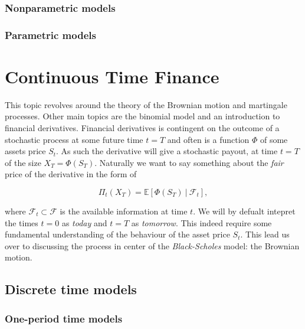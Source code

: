 \documentclass[a4paper,12pt,openany]{book}
\begin{document}
\hypertarget{nonparametric-models}{%
\subsection{Nonparametric models}\label{nonparametric-models}}

\hypertarget{parametric-models}{%
\subsection{Parametric models}\label{parametric-models}}

\hypertarget{continuous-time-finance}{%
\chapter{Continuous Time Finance}\label{continuous-time-finance}}

This topic revolves around the theory of the Brownian motion and martingale processes. Other main topics are the binomial model and an introduction to financial derivatives. Financial derivatives is contingent on the outcome of a stochastic process at some future time \(t=T\) and often is a function \(\Phi\) of some assets price \(S_t\). As such the derivative will give a stochastic payout, at time \(t=T\) of the size \(X_T=\Phi(S_T)\). Naturally we want to say something about the \emph{fair} price of the derivative in the form of

\[
\Pi_t(X_T)=\mathbb{E}\left[\Phi(S_T)\ \vert\ \mathcal{F}_t\right],
\]

where \(\mathcal{F}_t\subset\mathcal{F}\) is the available information at time \(t\). We will by defualt intepret the times \(t=0\) as \emph{today} and \(t=T\) as \emph{tomorrow}. This indeed require some fundamental understanding of the behaviour of the asset price \(S_t\). This lead us over to discussing the process in center of the \emph{Black-Scholes} model: the Brownian motion.

\hypertarget{discrete-time-models}{%
\section{Discrete time models}\label{discrete-time-models}}

\hypertarget{one-period-time-models}{%
\subsection{One-period time models}\label{one-period-time-models}}
\end{document}
